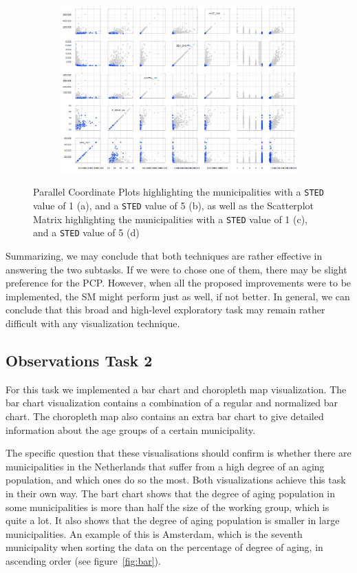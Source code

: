 \begin{figure}[h!]
\begin{subfigure}[t]{0.48\textwidth}
        \caption{ }
    \end{subfigure}
    \begin{subfigure}[t]{0.48\textwidth}
        \includegraphics[width=\textwidth]{img/sm_STED5.png}
        \caption{ }
    \end{subfigure}
    \caption{Parallel Coordinate Plots highlighting the municipalities with a \texttt{STED} value of 1 (a), and a \texttt{STED} value of 5 (b), as well as the Scatterplot Matrix highlighting the municipalities with a \texttt{STED} value of 1 (c), and a \texttt{STED} value of 5 (d)}
    \label{fig:sted}
\end{figure}

Summarizing, we may conclude that both techniques are rather effective in answering the two subtasks. If we were to chose one of them, there may be  slight preference for the PCP. However, when all the proposed improvements were to be implemented, the SM might perform just as well, if not better. In general, we can conclude that this broad and high-level exploratory task may remain rather difficult with any visualization technique.


\subsection{Observations Task 2}
For this task we implemented a bar chart and choropleth map visualization. The bar chart visualization contains a combination of a regular and normalized bar chart. The choropleth map also contains an extra bar chart to give detailed information about the age groups of a certain municipality.

The specific question that these visualisations should confirm is whether there are municipalities in the Netherlands that suffer from a high degree of an aging population, and which ones do so the most. Both visualizations achieve this task in their own way. The bart chart shows that the degree of aging population in some municipalities is more than half the size of the working group, which is quite a lot. It also shows that the degree of aging population is smaller in large municipalities. An example of this is Amsterdam, which is the seventh municipality when sorting the data on the percentage of degree of aging, in ascending order (see figure~\ref{fig:bar}).

